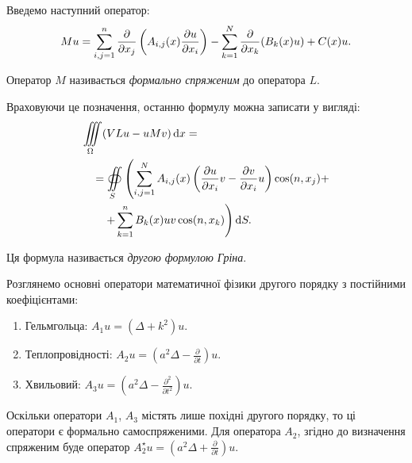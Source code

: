 Введемо наступний оператор:
\begin{equation}
    M u = \displaystyle\sum\limits_{i, j = 1}^n \frac{\partial}{\partial x_j} \left( A_{i,j}(x) \frac{\partial u}{\partial x_i} \right) - \displaystyle\sum\limits_{k = 1}^N \frac{\partial}{\partial x_k} (B_k(x) u) + C(x) u.
\end{equation}

\begin{definition}
    Оператор $M$ називається \textit{формально спряженим} до оператора $L$.
\end{definition}

Враховуючи це позначення, останню формулу можна записати у вигляді:
\begin{equation}
    \begin{aligned}
        & \displaystyle\iiint\limits_\Omega (V L u - u M v) \mathop{}\!\mathrm{d} x = \\
        & \quad = \displaystyle\oiint\limits_S \left( \displaystyle\sum\limits_{i, j = 1}^N A_{i, j}(x) \left( \frac{\partial u}{\partial x_i} v -  \frac{\partial v}{\partial x_i} u \right) \cos(n, x_j) + \right. \\
        & \qquad \left. + \displaystyle\sum\limits_{k = 1}^n B_k(x) u v \cos(n, x_k) \right) \mathop{}\!\mathrm{d} S.
    \end{aligned}
\end{equation}

\begin{definition}
    Ця формула називається \textit{другою формулою Гріна}.
\end{definition}

Розглянемо основні оператори математичної фізики другого порядку з постійними коефіцієнтами:
\begin{enumerate}
    \item Гельмгольца: $A_1 u = (\Delta + k^2) u$.
    \item Теплопровідності: $A_2 u = \left( a^2 \Delta - \frac{\partial}{\partial t} \right) u$.
    \item Хвильовий: $A_3 u = \left( a^2 \Delta - \frac{\partial^2}{\partial t^2} \right) u$.
\end{enumerate}

Оскільки оператори $A_1$, $A_3$ містять лише похідні другого порядку, то ці оператори є формально самоспряженими. Для оператора $A_2$, згідно до визначення спряженим буде оператор $A_2^\star u = \left( a^2 \Delta + \frac{\partial}{\partial t} \right) u$. \medskip

